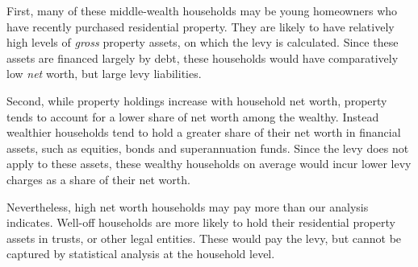 First, many of these middle-wealth households may be young homeowners who have recently purchased residential property. They are likely to have relatively high levels of \emph{gross} property assets, on which the levy is calculated. Since these assets are financed largely by debt, these households would have comparatively low \emph{net} worth, but large levy liabilities. 

Second, while property holdings increase with household net worth, property tends to account for a lower share of net worth among the wealthy. Instead wealthier households tend to hold a greater share of their net worth in financial assets, such as equities, bonds and superannuation funds. Since the levy does not apply to these assets, these wealthy households on average would incur lower levy charges as a share of their net worth. 

Nevertheless, high net worth households may pay more than our analysis indicates. Well-off households are more likely to hold their residential property assets in trusts, or other legal entities. These would pay the levy, but cannot be captured by statistical analysis at the household level. 

